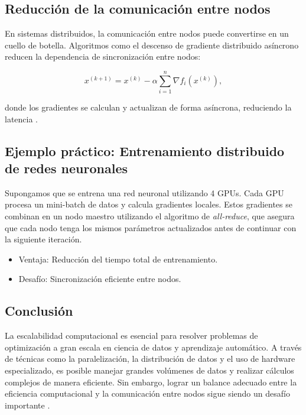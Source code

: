 \begin{itemize}
		\subsection{Reducción de la comunicación entre nodos}
		
		En sistemas distribuidos, la comunicación entre nodos puede convertirse en un cuello de botella. Algoritmos como el descenso de gradiente distribuido asíncrono reducen la dependencia de sincronización entre nodos:
		
		\begin{equation}
			x^{(k+1)} = x^{(k)} - \alpha \sum_{i=1}^n \nabla f_i(x^{(k)}),
		\end{equation}
		
		donde los gradientes se calculan y actualizan de forma asíncrona, reduciendo la latencia \cite{recht2011hogwild}.
		
		\subsection{Ejemplo práctico: Entrenamiento distribuido de redes neuronales}
		
		Supongamos que se entrena una red neuronal utilizando 4 GPUs. Cada GPU procesa un mini-batch de datos y calcula gradientes locales. Estos gradientes se combinan en un nodo maestro utilizando el algoritmo de \textit{all-reduce}, que asegura que cada nodo tenga los mismos parámetros actualizados antes de continuar con la siguiente iteración.
		
		\begin{itemize}
			\item Ventaja: Reducción del tiempo total de entrenamiento.
			\item Desafío: Sincronización eficiente entre nodos.
		\end{itemize}
		
		\subsection{Conclusión}
		
		La escalabilidad computacional es esencial para resolver problemas de optimización a gran escala en ciencia de datos y aprendizaje automático. A través de técnicas como la paralelización, la distribución de datos y el uso de hardware especializado, es posible manejar grandes volúmenes de datos y realizar cálculos complejos de manera eficiente. Sin embargo, lograr un balance adecuado entre la eficiencia computacional y la comunicación entre nodos sigue siendo un desafío importante \cite{dean2008mapreduce}.
		

\end{itemize}
